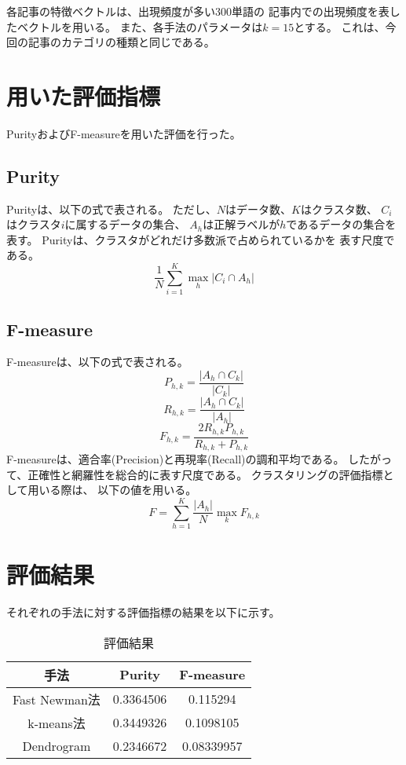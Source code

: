 \documentclass{jsarticle}
\begin{document}
各記事の特徴ベクトルは、出現頻度が多い300単語の
記事内での出現頻度を表したベクトルを用いる。
また、各手法のパラメータは$k=15$とする。
これは、今回の記事のカテゴリの種類と同じである。

\section{用いた評価指標}
PurityおよびF-measureを用いた評価を行った。

\subsection{Purity}
Purityは、以下の式で表される。
ただし、$N$はデータ数、$K$はクラスタ数、
$C_i$はクラスタ$i$に属するデータの集合、
$A_h$は正解ラベルが$h$であるデータの集合を表す。
Purityは、クラスタがどれだけ多数派で占められているかを
表す尺度である。
\begin{equation}
    \frac{1}{N}\sum_{i=1}^K \max_h |C_i \cap A_h|
\end{equation}

\subsection{F-measure}
F-measureは、以下の式で表される。
\begin{equation}
    P_{h,k}=\frac{|A_h \cap C_k|}{|C_k|}
\end{equation}
\begin{equation}
    R_{h,k}=\frac{|A_h \cap C_k|}{|A_h|}
\end{equation}
\begin{equation}
    F_{h,k}=\frac{2R_{h,k}P_{h,k}}{R_{h,k}+P_{h,k}}
\end{equation}
F-measureは、適合率(Precision)と再現率(Recall)の調和平均である。
したがって、正確性と網羅性を総合的に表す尺度である。
クラスタリングの評価指標として用いる際は、
以下の値を用いる。
\begin{equation}
    F=\sum_{h=1}^K \frac{|A_h|}{N} \max_k F_{h,k}
\end{equation}

\section{評価結果}
それぞれの手法に対する評価指標の結果を以下に示す。

\begin{table}[h]
    \caption{評価結果}
    \centering
    \begin{tabular}{c|c|c} \hline
        手法 & Purity & F-measure \\ \hline
        Fast Newman法 & 0.3364506 & 0.115294 \\
        k-means法 & 0.3449326 & 0.1098105 \\
        Dendrogram & 0.2346672 & 0.08339957 \\ \hline
    \end{tabular}
\end{table}
\end{document}
